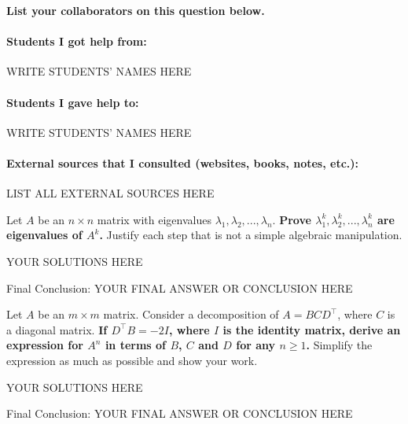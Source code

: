 
\textbf{List your collaborators on this question below. }

\begin{solution}

\paragraph{Students I got help from:} WRITE STUDENTS' NAMES HERE

\paragraph{Students I gave help to:} WRITE STUDENTS' NAMES HERE

\paragraph{External sources that I consulted (websites, books, notes, etc.):} LIST ALL EXTERNAL SOURCES HERE

\end{solution}

\qpart{[5 points]}
Let $A$ be an $n\times n$ matrix with eigenvalues $\lambda_1, \lambda_2, ..., \lambda_n$. \textbf{Prove $\lambda_1^k, \lambda_2^k, ..., \lambda_n^k$ are eigenvalues of $A^k$.} Justify each step that is not a simple algebraic manipulation. 

\begin{solution}

YOUR SOLUTIONS HERE

{\color{red} Final Conclusion: YOUR FINAL ANSWER OR CONCLUSION HERE}

\end{solution}

\qpart{[5 points]}

Let $A$ be an $m\times m$ matrix. Consider a decomposition of $A=BCD^\top$, where $C$ is a diagonal matrix. \textbf{If $D^\top B = -2I$, where $I$ is the identity matrix, derive an expression for $A^n$ in terms of $B$, $C$ and $D$ for any $n \geq 1$.} Simplify the expression as much as possible and show your work. 

\begin{solution}

YOUR SOLUTIONS HERE

{\color{red} Final Conclusion: YOUR FINAL ANSWER OR CONCLUSION HERE}

\end{solution}

